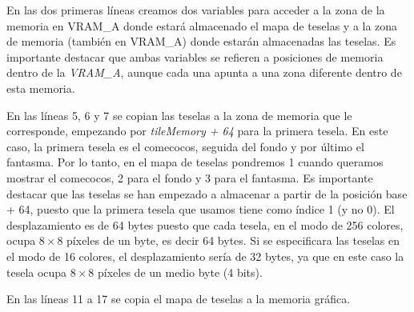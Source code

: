 En las dos primeras líneas creamos dos variables para acceder a la zona de la memoria en VRAM\_A donde estará almacenado el mapa de teselas y a la zona de memoria (también en VRAM\_A) donde estarán almacenadas las teselas. Es importante destacar que ambas variables se refieren a posiciones de memoria dentro de la \textit{VRAM\_A}, aunque cada una apunta a una zona diferente dentro de esta memoria.

En las líneas 5, 6 y 7 se copian las teselas a la zona de memoria que le corresponde, empezando por \textit{tileMemory + 64} para la primera tesela. En este caso, la primera tesela es el comecocos, seguida del fondo y por último el fantasma. Por lo tanto, en el mapa de teselas pondremos 1 cuando queramos mostrar el comecocos, 2 para el fondo y 3 para el fantasma. Es importante destacar que las teselas se han empezado a almacenar a partir de la posición base + 64, puesto que la primera tesela que usamos tiene como índice 1 (y no 0). El desplazamiento es de 64 bytes puesto que cada tesela, en el modo de 256 colores, ocupa $8\times8$ píxeles de un byte, es decir 64 bytes. Si se especificara las teselas en el modo de 16 colores, el desplazamiento sería de 32 bytes, ya que en este caso la tesela ocupa $8\times8$ píxeles de un medio byte (4 bits).

En las líneas 11 a 17 se copia el mapa de teselas a la memoria gráfica.

